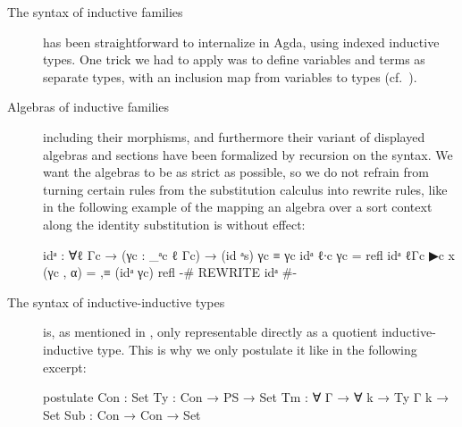 \begin{description}
\item[The syntax of inductive families] has been straightforward to internalize
in Agda, using indexed inductive types.
One trick we had to apply was to define variables and terms as separate types,
with an inclusion map from variables to types (cf.~).
\item[Algebras of inductive families] including their morphisms, and furthermore
their variant of displayed algebras and sections have been formalized by
recursion on the syntax.
We want the algebras to be as strict as possible, so we do not refrain from turning certain
rules from the substitution calculus into rewrite rules, like in the following example
of the mapping an algebra over a sort context along the identity substitution
is without effect:
\begin{agdacode}
idᵃ : ∀{ℓ Γc} → (γc : _ᵃc {ℓ} Γc) → (id ᵃs) γc ≡ γc
idᵃ {ℓ}{∙c}      γc       = refl
idᵃ {ℓ}{Γc ▶c x} (γc , α) = ,≡ (idᵃ γc) refl
{-# REWRITE idᵃ #-}
\end{agdacode}
\item[The syntax of inductive-inductive types] is, as mentioned in ,
only representable directly as a quotient inductive-inductive type.
This is why we only postulate it like in the following excerpt:
\begin{agdacode}
postulate
  Con : Set
  Ty  : Con → PS → Set
  Tm  : ∀ Γ → ∀ {k} → Ty Γ k → Set
  Sub : Con → Con → Set


\end{agdacode}
\end{description}
